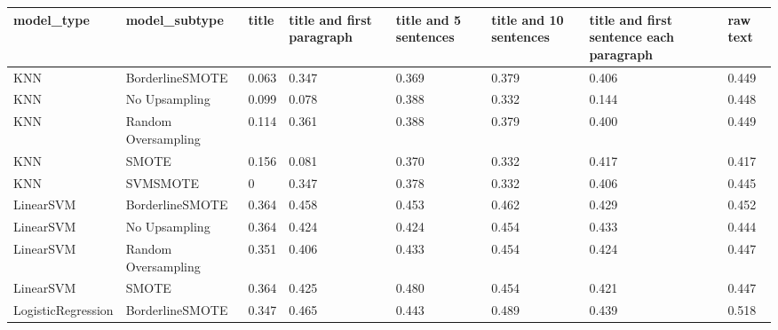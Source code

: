 \begin{tabular}{llllllll}
\toprule
                  model\_type &       model\_subtype & title & title and first paragraph & title and 5 sentences & title and 10 sentences & title and first sentence each paragraph &  raw text \\
\midrule
                         KNN &     BorderlineSMOTE & 0.063 &                     0.347 &                 0.369 &                  0.379 &                                   0.406 &     0.449 \\
                         KNN &       No Upsampling & 0.099 &                     0.078 &                 0.388 &                  0.332 &                                   0.144 &     0.448 \\
                         KNN & Random Oversampling & 0.114 &                     0.361 &                 0.388 &                  0.379 &                                   0.400 &     0.449 \\
                         KNN &               SMOTE & 0.156 &                     0.081 &                 0.370 &                  0.332 &                                   0.417 &     0.417 \\
                         KNN &            SVMSMOTE &     0 &                     0.347 &                 0.378 &                  0.332 &                                   0.406 &     0.445 \\
                   LinearSVM &     BorderlineSMOTE & 0.364 &                     0.458 &                 0.453 &                  0.462 &                                   0.429 &     0.452 \\
                   LinearSVM &       No Upsampling & 0.364 &                     0.424 &                 0.424 &                  0.454 &                                   0.433 &     0.444 \\
                   LinearSVM & Random Oversampling & 0.351 &                     0.406 &                 0.433 &                  0.454 &                                   0.424 &     0.447 \\
                   LinearSVM &               SMOTE & 0.364 &                     0.425 &                 0.480 &                  0.454 &                                   0.421 &     0.447 \\
          LogisticRegression &     BorderlineSMOTE & 0.347 &                     0.465 &                 0.443 &                  0.489 &                                   0.439 &     0.518 \\

\end{tabular}
